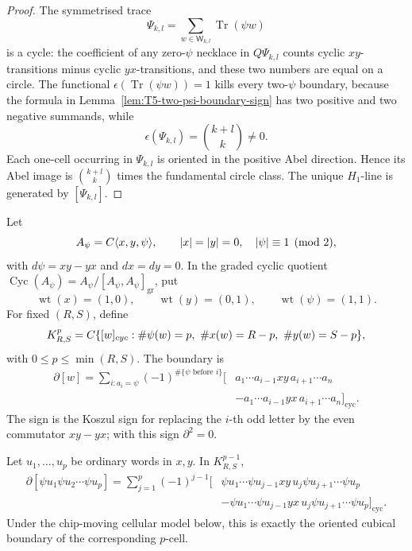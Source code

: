 \begin{proof}
  The symmetrised trace
  \[
    \Psi_{k,l}=\sum_{w\in\mathsf W_{k,l}}\operatorname{Tr}(\psi w)
  \]
  is a cycle: the coefficient of any zero-\(\psi\) necklace in
  \(Q\Psi_{k,l}\) counts cyclic \(xy\)-transitions minus cyclic
  \(yx\)-transitions, and these two numbers are equal on a circle.  The
  functional \(\epsilon(\operatorname{Tr}(\psi w))=1\) kills every
  two-\(\psi\) boundary, because the formula in
  Lemma~\ref{lem:T5-two-psi-boundary-sign} has two positive and two
  negative summands, while
  \[
    \epsilon(\Psi_{k,l})=\binom{k+l}{k}\neq0.
  \]
  Each one-cell occurring in \(\Psi_{k,l}\) is oriented in the positive
  Abel direction.  Hence its Abel image is
  \(\binom{k+l}{k}\) times the fundamental circle class.  The unique
  \(H_1\)-line is generated by \([\Psi_{k,l}]\).
\end{proof}

\begin{defn}\label{def:T5-full-psi-complex}
  Let
	  \[
	    A_\psi=C\langle x,y,\psi\rangle,\qquad
	    |x|=|y|=0,\quad |\psi|\equiv1\pmod2,
	  \]
  with \(d\psi=xy-yx\) and \(dx=dy=0\).  In the graded cyclic quotient
  \(\operatorname{Cyc}(A_\psi)=A_\psi/[A_\psi,A_\psi]_{\mathrm{gr}}\),
  put
  \[
    \operatorname{wt}(x)=(1,0),\qquad
    \operatorname{wt}(y)=(0,1),\qquad
    \operatorname{wt}(\psi)=(1,1).
  \]
  For fixed \((R,S)\), define
  \[
    K^p_{R,S}
      =
      C\{[w]_{cyc}:
        \#\psi(w)=p,\ \#x(w)=R-p,\ \#y(w)=S-p\},
  \]
  with \(0\le p\le\min(R,S)\).  The boundary is
  \[
  \begin{aligned}
    \partial[w]
      =
      \sum_{i:a_i=\psi}(-1)^{\#\{\psi\text{ before }i\}}
      [&a_1\cdots a_{i-1}xy\,a_{i+1}\cdots a_n  \\
       &-a_1\cdots a_{i-1}yx\,a_{i+1}\cdots a_n]_{\mathrm{cyc}} .
  \end{aligned}
  \]
  The sign is the Koszul sign for replacing the \(i\)-th odd letter by
  the even commutator \(xy-yx\); with this sign \(\partial^2=0\).
\end{defn}

\begin{lem}\label{lem:T5-full-p-face-sign}
  Let \(u_1,\ldots,u_p\) be ordinary words in \(x,y\).  In
  \(K^{p-1}_{R,S}\),
  \[
  \begin{aligned}
    \partial[\psi u_1\psi u_2\cdots\psi u_p]
      =
      \sum_{j=1}^p(-1)^{j-1}
      [&\psi u_1\cdots\psi u_{j-1}xy\,u_j
        \psi u_{j+1}\cdots\psi u_p\\
       &-\psi u_1\cdots\psi u_{j-1}yx\,u_j
        \psi u_{j+1}\cdots\psi u_p]_{\mathrm{cyc}} .
  \end{aligned}
  \]
  Under the chip-moving cellular model below, this is exactly the
  oriented cubical boundary of the corresponding \(p\)-cell.
\end{lem}

